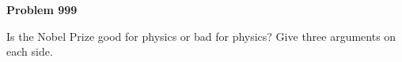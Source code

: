 \documentclass[12pt]{article}
\begin{document}
\begin{pottproblem}
\textbf{Problem 999}

Is the Nobel Prize good for physics or bad for physics?
Give three arguments on each side.

\end{pottproblem}
\end{document}
